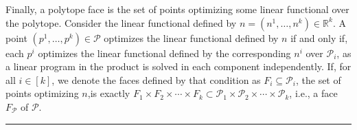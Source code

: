 \documentclass{article}
\newcommand{\R}{\mathbb{R}}
\newcommand{\jmlrBlackBox}{\rule{1.5ex}{1.5ex}}
\newcommand{\jmlrQED}{\hfill\jmlrBlackBox\par\bigskip}
\providecommand{\proofname}{Proof}
\renewenvironment{proof}%
{%
 \par\noindent{\bfseries\upshape \proofname\ }%
}%
{\jmlrQED}
\newcommand{\mP}{\mathcal{P}}
\newcommand{\mQ}{\mathcal{Q}}
\newcommand{\verts}[1]{\mathcal{V}_{#1}}
\begin{document}
\begin{proof}
Finally, a polytope face is the set of points optimizing some linear functional over the polytope.
Consider the linear functional defined by $n = (n^1, \ldots, n^k) \in \R^k$.
A point $(p^1, \ldots, p^k) \in \mP$ optimizes the linear functional defined by $n$ if and only if, each $p^i$ optimizes the linear functional defined by the corresponding $n^i$ over $\mP_i$, as a linear program in the product is solved in each component independently.
If, for all $i \in [k]$, we denote the faces defined by that condition as $F_i \subseteq \mP_i$, the set of points optimizing $n$,is exactly $F_1 \times F_2 \times \cdots \times F_k \subset \mP_1 \times \mP_2 \times \cdots \times \mP_k$, i.e., a face $F_\mP$ of $\mP$.
\end{proof}
\end{document}
